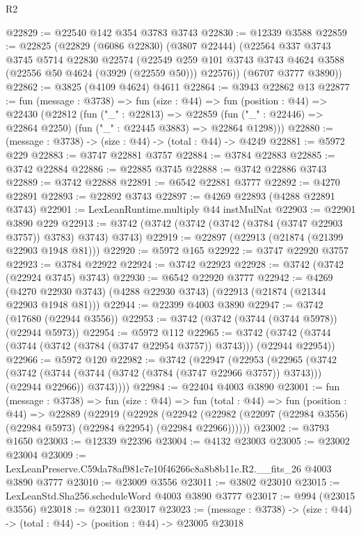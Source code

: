 \begin{lexlean}{R2}
\begin{coremodule}
@22829 := @22540 @142 @354 @3783 @3743
@22830 := @12339 @3588
@22859 := @22825
    (@22829
      (@6086 @22830)
      (@3807 @22444)
      (@22564
        @337
        @3743
        @3745
        @5714
        @22830
        @22574
        (@22549 @259 @101 @3743 @3743 @4624 @3588 (@22556 @50 @4624 (@3929 (@22559 @50))) @22576))
      (@6707 @3777 @3890))
@22862 := @3825 (@4109 @4624) @4611
@22864 := @3943 @22862 @13
@22877 := fun (message : @3738) =>
  fun (size : @44) =>
  fun (position : @44) =>
  @22430
    (@22812
      (fun ("_" : @22813) =>
      @22859 (fun ("_" : @22446) => @22864 @2250) (fun ("_" : @22445 @3883) => @22864 @1298)))
@22880 := (message : @3738) -> (size : @44) -> (total : @44) -> @4249
@22881 := @5972 @229
@22883 := @3747 @22881 @3757
@22884 := @3784 @22883
@22885 := @3742 @22884
@22886 := @22885 @3745
@22888 := @3742 @22886 @3743
@22889 := @3742 @22888
@22891 := @6542 @22881 @3777
@22892 := @4270 @22891
@22893 := @22892 @3743
@22897 := @4269 @22893 (@4288 @22891 @3743)
@22901 := LexLeanRuntime.multiply @44 instMulNat
@22903 := @22901 @3890 @229
@22913 := @3742 (@3742 (@3742 (@3742 (@3784 (@3747 @22903 @3757)) @3783) @3743) @3743)
@22919 := @22897 (@22913 (@21874 (@21399 @22903 @1948 @81)))
@22920 := @5972 @165
@22922 := @3747 @22920 @3757
@22923 := @3784 @22922
@22924 := @3742 @22923
@22928 := @3742 (@3742 (@22924 @3745) @3743)
@22930 := @6542 @22920 @3777
@22942 := @4269
    (@4270 @22930 @3743)
    (@4288 @22930 @3743)
    (@22913 (@21874 (@21344 @22903 @1948 @81)))
@22944 := @22399 @4003 @3890
@22947 := @3742 (@17680 (@22944 @3556))
@22953 := @3742 (@3742 (@3744 (@3744 @5978)) (@22944 @5973))
@22954 := @5972 @112
@22965 := @3742 (@3742 (@3744 (@3744 (@3742 (@3784 (@3747 @22954 @3757)) @3743))) (@22944 @22954))
@22966 := @5972 @120
@22982 := @3742
    (@22947
      (@22953
        (@22965
          (@3742
            (@3742 (@3744 (@3744 (@3742 (@3784 (@3747 @22966 @3757)) @3743))) (@22944 @22966))
            @3743))))
@22984 := @22404 @4003 @3890
@23001 := fun (message : @3738) =>
  fun (size : @44) =>
  fun (total : @44) =>
  fun (position : @44) =>
  @22889
    (@22919
      (@22928
        (@22942 (@22982 (@22097 (@22984 @3556) (@22984 @5973) (@22984 @22954) (@22984 @22966))))))
@23002 := @3793 @1650
@23003 := @12339 @22396
@23004 := @4132 @23003
@23005 := @23002 @23004
@23009 := LexLeanPreserve.C59da78af981c7e10f46266c8a8b8b11e.R2.__fits_26 @4003 @3890 @3777
@23010 := @23009 @3556
@23011 := @3802 @23010
@23015 := LexLeanStd.Sha256.scheduleWord @4003 @3890 @3777
@23017 := @994 (@23015 @3556)
@23018 := @23011 @23017
@23023 := (message : @3738) -> (size : @44) -> (total : @44) -> (position : @44) -> @23005 @23018

\end{coremodule}
\end{lexlean}
